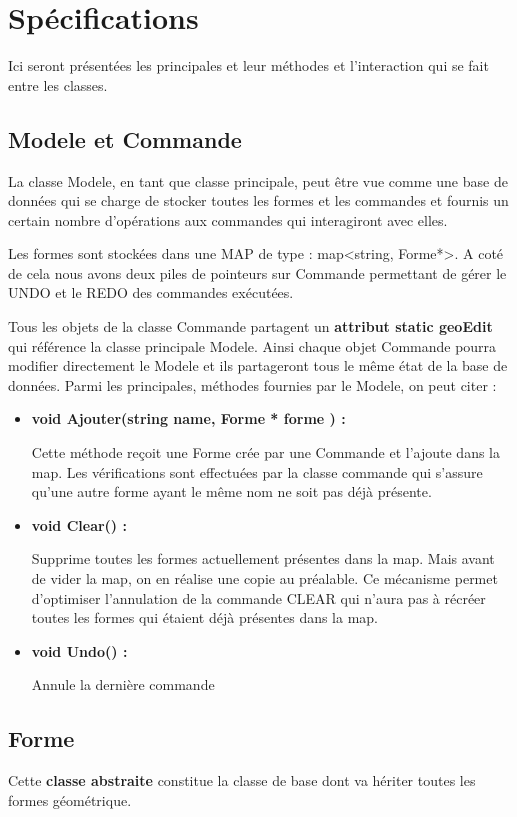 \documentclass[12pt]{article}
\begin{document}
\section{Spécifications}
Ici seront présentées les principales et leur méthodes et l’interaction qui se fait entre les classes.
\subsection{Modele et Commande}
La classe Modele, en tant que classe principale, peut être vue comme une base de données qui se charge de stocker toutes les formes et les commandes et fournis un certain nombre d’opérations aux commandes qui interagiront avec elles. 

Les formes sont stockées dans une MAP de type : map<string, Forme*>. A coté de cela nous avons deux piles de pointeurs sur Commande permettant de gérer le UNDO et le REDO des commandes exécutées.
 
Tous les objets de la classe Commande partagent un \textbf{attribut static geoEdit} qui référence la classe principale Modele. Ainsi chaque objet Commande pourra modifier directement le Modele et ils partageront tous le même état de la base de données. Parmi les principales, méthodes fournies par le Modele, on peut citer :
\newline
\begin{itemize}
\item \textbf{void Ajouter(string name, Forme * forme ) :}

Cette méthode reçoit une Forme crée par une Commande et l’ajoute dans la map. Les vérifications sont effectuées par la classe commande qui s’assure qu’une autre forme ayant le même nom ne soit pas déjà présente.

\item \textbf{void Clear() :}

Supprime toutes les formes actuellement présentes dans la map. Mais avant de vider la map, on en réalise une copie au préalable. Ce mécanisme permet d’optimiser l’annulation de la commande CLEAR qui n’aura pas à récréer toutes les formes qui étaient déjà présentes dans la map.

\item  \textbf{void Undo() :}

Annule la dernière commande
\end{itemize}

\subsection{Forme}
Cette \textbf{classe abstraite} constitue la classe de base dont va hériter toutes les formes géométrique.
\end{document}
